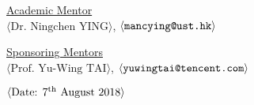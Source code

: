 \begin{center}
\vspace \shiftdownb
\underline {Academic Mentor} \\
\vspace{5pt}
$\langle \text{Dr. Ningchen YING}\rangle$, $\langle \text{\texttt{mancying@ust.hk}} \rangle$

\vspace \shiftdownb
\underline {Sponsoring Mentors}\\
\vspace{5pt}
$\langle \text{Prof. Yu-Wing TAI}\rangle$, $\langle \text{\texttt{yuwingtai@tencent.com}} \rangle$\\
\vspace{3pt}


\vspace{5pt}
\vspace{3pt}

\vspace \shiftdowna
$\langle \text{Date: $7^{\textnormal{th}}$ August 2018}\rangle$ 

\end{center}

 

